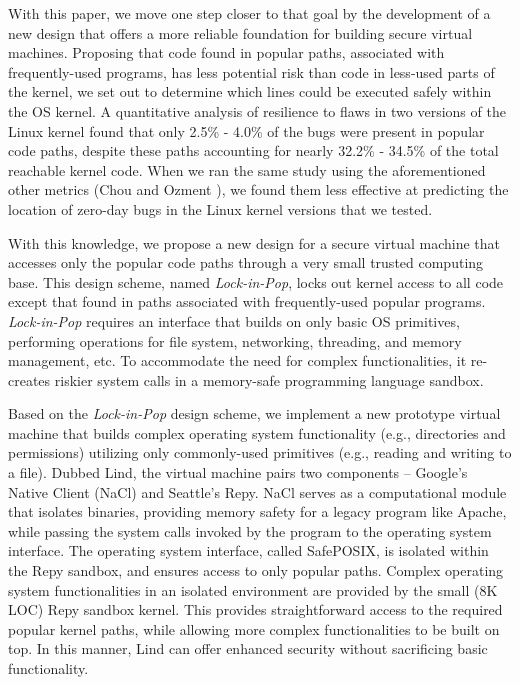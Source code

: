 With this paper, we move one step closer to that goal by the development
of a new design that offers a more reliable foundation for building secure virtual machines.
Proposing that code found in popular paths, associated with frequently-used programs,
has less potential risk than code in less-used parts of the kernel, we set out to determine
which lines could be executed safely within the OS kernel.
A quantitative analysis of resilience to flaws in two versions of the Linux kernel
found that only 2.5\% - 4.0\% of the bugs were present in popular code paths,
despite these paths accounting for nearly 32.2\% - 34.5\% of the total reachable kernel code.
When we ran the same study using the aforementioned other metrics
(Chou \cite{PittSFIeld} and Ozment \cite{ozment2006milk}),
we found them less effective at predicting the location of zero-day bugs in the
Linux kernel versions that we tested.

With this knowledge, we propose a new design for a secure virtual machine that
accesses only the popular code paths through a very small trusted computing base.
This design scheme, named \emph{Lock-in-Pop}, locks out kernel access to all code except
that found in paths associated with frequently-used popular programs. \emph{Lock-in-Pop} requires an interface
that builds on only basic OS primitives, performing operations for file system,
networking, threading, and memory management, etc.
To accommodate the need for complex functionalities, it re-creates riskier system calls in
a memory-safe programming language sandbox.

Based on the \emph{Lock-in-Pop} design scheme, we implement a new prototype virtual
 machine that builds complex operating system functionality (e.g., directories and
 permissions) utilizing only commonly-used primitives (e.g., reading and writing to a file).
Dubbed Lind, the virtual machine pairs two components -- Google's Native Client
(NaCl) and Seattle's Repy.
NaCl serves as a computational module that isolates binaries, providing memory
safety for a legacy program like Apache,
while passing the system calls invoked by the  program to the operating system interface.
The operating system interface, called SafePOSIX, is isolated within the Repy
sandbox, and ensures access to only popular paths.
Complex operating system functionalities in an isolated environment are
provided by the small (8K LOC) Repy sandbox kernel.
This provides straightforward access to the required popular kernel paths,
while allowing more complex functionalities to be built on top.
In this manner, Lind can offer enhanced security without sacrificing basic functionality.

